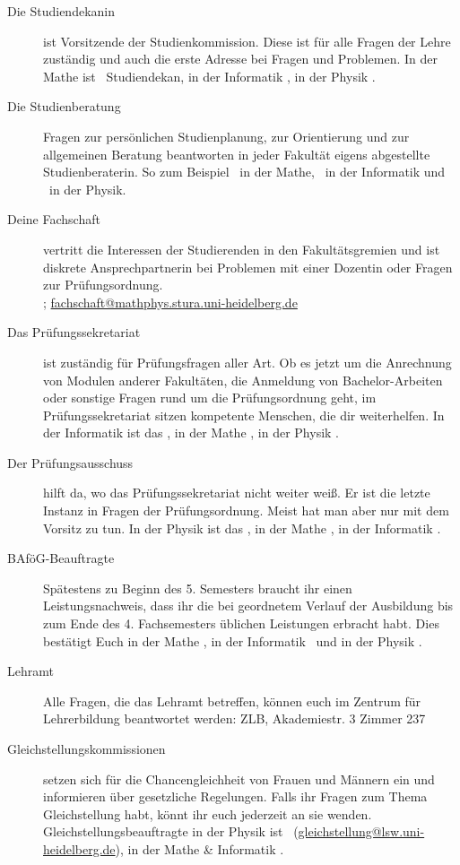 \begin{description}
\item[Die Studiendekanin] ist Vorsitzende der Studienkommission. Diese ist für alle Fragen der Lehre zuständig und auch die erste Adresse bei Fragen und Problemen. In der Mathe ist \studiendekanmathe\ Studiendekan, in der Informatik \studiendekaninformatik , in der Physik \studiendekanphysik .

\item[Die Studienberatung] Fragen zur persönlichen Studienplanung, zur Orientierung und zur allgemeinen Beratung beantworten in jeder Fakultät eigens abgestellte Studienberaterin. So zum Beispiel \studienberatungmathe\ in der Mathe, \studienberatunginformatik\ in der Informatik und \studienberatungphysik\ in der Physik.

\item[Deine Fachschaft] vertritt die Interessen der Studierenden in den Fakultätsgremien und ist diskrete Ansprechpartnerin bei Problemen mit einer Dozentin oder Fragen zur Prüfungsordnung. \\\fsraum; \url{fachschaft@mathphys.stura.uni-heidelberg.de}

\item[Das Prüfungssekretariat] ist zuständig für Prüfungsfragen aller Art. Ob es jetzt um die Anrechnung von Modulen anderer Fakultäten, die Anmeldung von Bachelor-Arbeiten oder sonstige Fragen rund um die Prüfungsordnung geht, im Prüfungssekretariat sitzen kompetente Menschen, die dir weiterhelfen. In der Informatik ist das \pruefsekinfo, in der Mathe \pruefsekmathe, in der Physik \pruefsekphysik.

\item[Der Prüfungsausschuss] hilft da, wo das Prüfungssekretariat nicht weiter weiß. Er ist die letzte Instanz in Fragen der Prüfungsordnung. Meist hat man aber nur mit dem Vorsitz zu tun. In der Physik ist das \pruefausschussvorsitzphysik, in der Mathe \pruefausschussvorsitzmathe, in der Informatik \pruefausschussvorsitzinformatik.

\item[BAföG-Beauftragte] Spätestens zu Beginn des 5. Semesters braucht ihr einen Leistungsnachweis, dass ihr die bei geordnetem Verlauf der Ausbildung bis zum Ende des 4. Fachsemesters üblichen Leistungen erbracht habt. Dies bestätigt Euch in der Mathe \bafogmathe , in der Informatik \bafoginformatik\ und in der Physik \bafogphysik .

\item[Lehramt] Alle Fragen, die das Lehramt betreffen, können euch im Zentrum für Lehrerbildung beantwortet werden: ZLB, Akademiestr. 3 Zimmer 237

\item[Gleichstellungskommissionen] setzen sich für die Chancengleichheit von Frauen und Männern ein und informieren über gesetzliche Regelungen. Falls ihr Fragen zum Thema Gleichstellung habt, könnt ihr euch jederzeit an sie wenden. Gleichstellungsbeauftragte in der Physik ist \gleichstellungsbeauftragtephysik\ (\url{gleichstellung@lsw.uni-heidelberg.de}), in der Mathe \& Informatik \gleichstellungsbeauftragtemathe .

\end{description}

